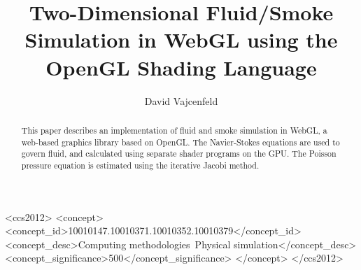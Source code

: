 \documentclass[sigplan,screen]{acmart}
\begin{document}
\title[2D Fluid/Smoke Simulation in WebGL using GLSL]{Two-Dimensional Fluid/Smoke Simulation in WebGL using the OpenGL Shading Language}

\author{David Vajcenfeld}

\renewcommand\shortauthors{Vajcenfeld D.}

\begin{abstract}
This paper describes an implementation of fluid and smoke simulation in WebGL,
a web-based graphics library based on OpenGL.
The Navier-Stokes equations are used to govern fluid, 
and calculated using separate shader programs on the GPU.
The Poisson pressure equation is estimated using the iterative Jacobi method. 
\end{abstract}

%
%
\begin{CCSXML}
    <ccs2012>
    <concept>
    <concept_id>10010147.10010371.10010352.10010379</concept_id>
    <concept_desc>Computing methodologies~Physical simulation</concept_desc>
    <concept_significance>500</concept_significance>
    </concept>
    </ccs2012>
\end{CCSXML}


\maketitle


\end{document}
